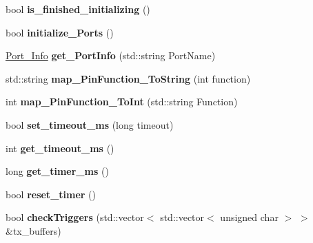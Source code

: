 \begin{DoxyCompactItemize}
\item 
\mbox{\label{classIONodeProcess_acf9db910a30472030eb7edc9876a7541}} 
bool {\bfseries is\+\_\+finished\+\_\+initializing} ()
\item 
\mbox{\label{classIONodeProcess_af2eda25698036035df824ed6cecdc663}} 
bool {\bfseries initialize\+\_\+\+Ports} ()
\item 
\mbox{\label{classIONodeProcess_a230f0e5435ed25149f96a4742f679f92}} 
\hyperlink{structPort__Info}{Port\+\_\+\+Info} {\bfseries get\+\_\+\+Port\+Info} (std\+::string Port\+Name)
\item 
\mbox{\label{classIONodeProcess_a927f96b78eb3fd275a15e5512b536cb6}} 
std\+::string {\bfseries map\+\_\+\+Pin\+Function\+\_\+\+To\+String} (int function)
\item 
\mbox{\label{classIONodeProcess_a1f061f2aa7e2b4e0788105fcee1c14d2}} 
int {\bfseries map\+\_\+\+Pin\+Function\+\_\+\+To\+Int} (std\+::string Function)
\item 
\mbox{\label{classIONodeProcess_a30f01145272c1ad50464c80cf31ed8bc}} 
bool {\bfseries set\+\_\+timeout\+\_\+ms} (long timeout)
\item 
\mbox{\label{classIONodeProcess_a2a00c8f5bbcce2a19a93ffebebc5c9c0}} 
int {\bfseries get\+\_\+timeout\+\_\+ms} ()
\item 
\mbox{\label{classIONodeProcess_af23ffc756d8b229dad370171029580b7}} 
long {\bfseries get\+\_\+timer\+\_\+ms} ()
\item 
\mbox{\label{classIONodeProcess_aea6106402ae8f4cb49dd773e9496f7f7}} 
bool {\bfseries reset\+\_\+timer} ()
\item 
\mbox{\label{classIONodeProcess_ad84c387845e9c1bd7dab4505178e738e}} 
bool {\bfseries check\+Triggers} (std\+::vector$<$ std\+::vector$<$ unsigned char $>$ $>$ \&tx\+\_\+buffers)
\item 
\mbox{\label{classIONodeProcess_a2b23f52e962f0b18edfcfd7980f56306}} 

\end{DoxyCompactItemize}
